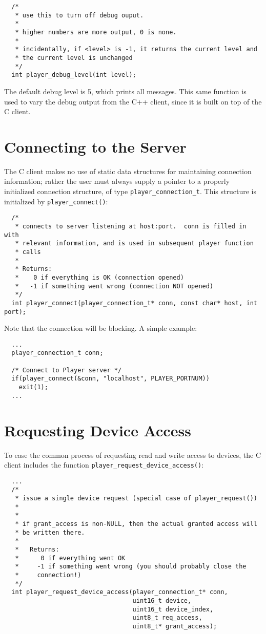 \documentclass[11pt]{report}
\begin{document}
{\small
\begin{verbatim}
  /*
   * use this to turn off debug ouput.
   *
   * higher numbers are more output, 0 is none.
   *
   * incidentally, if <level> is -1, it returns the current level and
   * the current level is unchanged
   */
  int player_debug_level(int level);
\end{verbatim}}

The default debug level is 5, which prints all messages.  This
same function is used to vary the debug output from the C++ client, since
it is built on top of the C client.


\section{Connecting to the Server}
The C client makes no use of static data structures for maintaining connection
information; rather the user must always supply a pointer to a properly
initialized connection structure, of type {\tt player\_connection\_t}.
This structure is initialized by {\tt player\_connect()}:

{\small
\begin{verbatim}
  /*
   * connects to server listening at host:port.  conn is filled in with
   * relevant information, and is used in subsequent player function
   * calls
   *
   * Returns:
   *    0 if everything is OK (connection opened)
   *   -1 if something went wrong (connection NOT opened)
   */
  int player_connect(player_connection_t* conn, const char* host, int port);
\end{verbatim}
}

Note that the connection will be blocking.  A simple example:

{\small
\begin{verbatim}
  ...
  player_connection_t conn;

  /* Connect to Player server */
  if(player_connect(&conn, "localhost", PLAYER_PORTNUM))
    exit(1);
  ...
\end{verbatim}
}

\section{Requesting Device Access}
To ease the common process of requesting read and write access to devices,
the C client includes the function {\tt player\_request\_device\_access()}:

{\small
\begin{verbatim}
  ...
  /*
   * issue a single device request (special case of player_request())
   *
   * 
   * if grant_access is non-NULL, then the actual granted access will
   * be written there.
   *
   *   Returns:
   *      0 if everything went OK
   *     -1 if something went wrong (you should probably close the
   *     connection!)
   */
  int player_request_device_access(player_connection_t* conn,
                                   uint16_t device,
                                   uint16_t device_index,
                                   uint8_t req_access,
                                   uint8_t* grant_access);
\end{verbatim}
}
\end{document}
